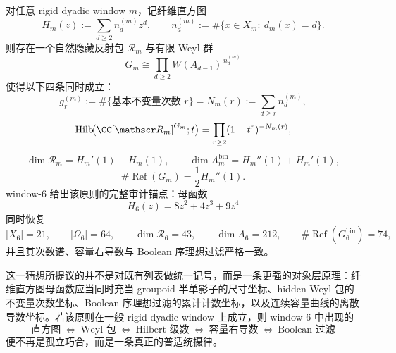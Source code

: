 \begin{conjecture}[直方图母函数原则]\label{conj:conclusion-window6-histogram-generator-principle}
对任意 rigid dyadic window \(m\)，记纤维直方图
\[
H_m(z):=\sum_{d\ge 2} n_d^{(m)} z^d,
\qquad
n_d^{(m)}:=\#\{x\in X_m:\ d_m(x)=d\}.
\]
则存在一个自然隐藏反射包 \(\mathscr R_m\) 与有限 Weyl 群
\[
G_m
\cong
\prod_{d\ge 2}W(A_{d-1})^{\,n_d^{(m)}}
\]
使得以下四条同时成立：
\[
g_r^{(m)}:=\#\{\text{基本不变量次数 }r\}
=
N_m(r):=\sum_{d\ge r}n_d^{(m)},
\]
\[
\operatorname{Hilb}\!\bigl(\CC[\mathscr R_m]^{G_m};t\bigr)
=
\prod_{r\ge 2}(1-t^r)^{-N_m(r)},
\]
\[
\dim \mathscr R_m=H_m'(1)-H_m(1),
\qquad
\dim A_m^{\mathrm{bin}}=H_m''(1)+H_m'(1),
\]
\[
\#\operatorname{Ref}(G_m)=\frac12 H_m''(1).
\]
window-\(6\) 给出该原则的完整审计锚点：母函数
\[
H_6(z)=8z^2+4z^3+9z^4
\]
同时恢复
\[
|X_6|=21,\qquad
|\Omega_6|=64,\qquad
\dim \mathscr R_6=43,\qquad
\dim A_6=212,\qquad
\#\operatorname{Ref}(G_6^{\mathrm{bin}})=74,
\]
并且其次数谱、容量右导数与 Boolean 序理想过滤严格一致。
\end{conjecture}

这一猜想所提议的并不是对既有列表做统一记号，而是一条更强的对象层原理：纤维直方图母函数应当同时充当 groupoid 半单影子的尺寸坐标、hidden Weyl 包的不变量次数坐标、Boolean 序理想过滤的累计计数坐标，以及连续容量曲线的离散导数坐标。若该原则在一般 rigid dyadic window 上成立，则 window-\(6\) 中出现的
\[
\text{直方图}\ \Longleftrightarrow\ \text{Weyl 包}\ \Longleftrightarrow\ \text{Hilbert 级数}\ \Longleftrightarrow\ \text{容量右导数}\ \Longleftrightarrow\ \text{Boolean 过滤}
\]
便不再是孤立巧合，而是一条真正的普适统摄律。
